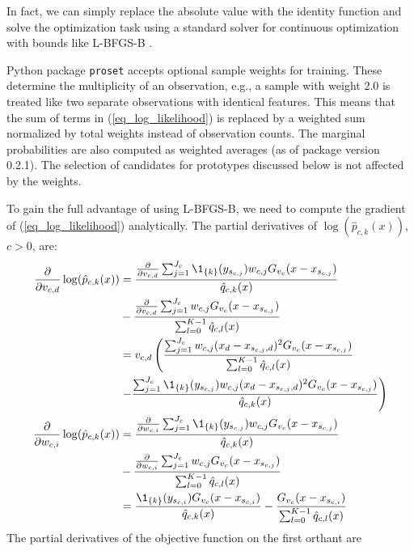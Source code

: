 In fact, we can simply replace the absolute value with the identity function and solve the optimization task using a standard solver for continuous optimization with bounds like L-BFGS-B \cite{Byrd_95}.
%
\begin{remark}
Python package \texttt{proset} accepts optional sample weights for training.
These determine the multiplicity of an observation, e.g., a sample with weight 2.0 is treated like two separate observations with identical features.
This means that the sum of terms in (\ref{eq_log_likelihood}) is replaced by a weighted sum normalized by total weights instead of observation counts.
The marginal probabilities are also computed as weighted averages (as of package version 0.2.1).
The selection of candidates for prototypes discussed below is not affected by the weights.
\end{remark}
%
To gain the full advantage of using L-BFGS-B, we need to compute the gradient of (\ref{eq_log_likelihood}) analytically.
The partial derivatives of $\log(\hat{p}_{c,k}(x))$, $c>0$, are:
%
\begin{align}
\frac{\partial}{\partial v_{c,d}}\log(\hat{p}_{c,k}(x))&
=\frac{\frac{\partial}{\partial v_{c,d}}
\sum_{j=1}^{J_c}\1_{\{k\}}(y_{s_{c,j}})w_{c,j}G_{v_c}(x-x_{s_{c,j}})}
{\hat{q}_{c,k}(x)}
\label{eq_p_partial_v}\\
&-\frac{\frac{\partial}{\partial v_{c,d}}
\sum_{j=1}^{J_c}w_{c,j}G_{v_c}(x-x_{s_{c,j}})}
{\sum_{l=0}^{K-1}\hat{q}_{c,l}(x)}\notag\\
&=v_{c,d}\left(\frac{\sum_{j=1}^{J_c}w_{c,j}
(x_d-x_{s_{c,j},d})^2G_{v_c}(x-x_{s_{c,j}})}
{\sum_{l=0}^{K-1}\hat{q}_{c,l}(x)}\right.\notag\\
&\left.-\frac{\sum_{j=1}^{J_c}\1_{\{k\}}(y_{s_{c,j}})w_{c,j}
(x_d-x_{s_{c,j},d})^2G_{v_c}(x-x_{s_{c,j}})}
{\hat{q}_{c,k}(x)}\right)\notag\\
\frac{\partial}{\partial w_{c,i}}\log(\hat{p}_{c,k}(x))&
=\frac{\frac{\partial}{\partial w_{c,i}}
\sum_{j=1}^{J_c}\1_{\{k\}}(y_{s_{c,j}})w_{c,j}G_{v_c}(x-x_{s_{c,j}})}
{\hat{q}_{c,k}(x)}
\label{eq_p_partial_w}\\
&-\frac{\frac{\partial}{\partial w_{c,i}}
\sum_{j=1}^{J_c}w_{c,j}G_{v_c}(x-x_{s_{c,j}})}
{\sum_{l=0}^{K-1}\hat{q}_{c,l}(x)}\notag\\
&=\frac{\1_{\{k\}}(y_{s_{c,i}})G_{v_c}(x-x_{s_{c,i}})}
{\hat{q}_{c,k}(x)}
-\frac{G_{v_c}(x-x_{s_{c,i}})}
{\sum_{l=0}^{K-1}\hat{q}_{c,l}(x)}\notag
\end{align}
%
The partial derivatives of the objective function on the first orthant are
